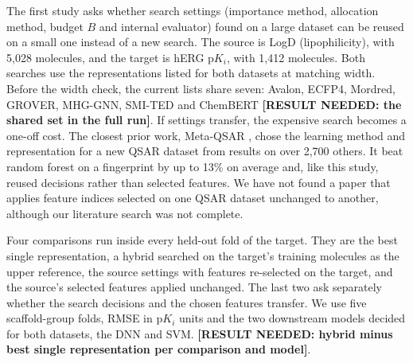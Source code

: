 The first study asks whether search settings (importance method, allocation method, budget $B$ and internal evaluator) found on a large dataset can be reused on a small one instead of a new search. The source is LogD (lipophilicity), with 5,028 molecules, and the target is hERG $\mathrm{p}K_i$, with 1,412 molecules. Both searches use the representations listed for both datasets at matching width. Before the width check, the current lists share seven: Avalon, ECFP4, Mordred, GROVER, MHG-GNN, SMI-TED and ChemBERT \textbf{[RESULT NEEDED: the shared set in the full run]}. If settings transfer, the expensive search becomes a one-off cost. The closest prior work, Meta-QSAR \citep{Olier2018}, chose the learning method and representation for a new QSAR dataset from results on over 2,700 others. It beat random forest on a fingerprint by up to 13\% on average and, like this study, reused decisions rather than selected features. We have not found a paper that applies feature indices selected on one QSAR dataset unchanged to another, although our literature search was not complete.

Four comparisons run inside every held-out fold of the target. They are the best single representation, a hybrid searched on the target's training molecules as the upper reference, the source settings with features re-selected on the target, and the source's selected features applied unchanged. The last two ask separately whether the search decisions and the chosen features transfer. %
We use five scaffold-group folds, RMSE in $\mathrm{p}K_i$ units and the two downstream models decided for both datasets, the DNN and SVM. \textbf{[RESULT NEEDED: hybrid minus best single representation per comparison and model]}.

